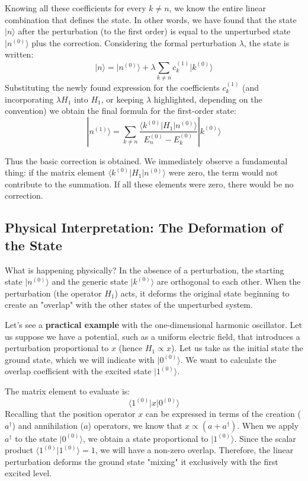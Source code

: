 Knowing all these coefficients for every $k \neq n$, we know the entire linear combination that defines the state.
In other words, we have found that the state $\vert{}n\rangle$ after the perturbation (to the first order) is equal to the unperturbed state $\vert{}n^{(0)}\rangle$ plus the correction. Considering the formal perturbation $\lambda$, the state is written:
\begin{equation}
|n\rangle = |n^{(0)}\rangle + \lambda \sum_{k \neq n} c_k^{(1)} |k^{(0)}\rangle
\end{equation}
Substituting the newly found expression for the coefficients $c_k^{(1)}$ (and incorporating $\lambda H_1$ into $H_1$, or keeping $\lambda$ highlighted, depending on the convention) we obtain the final formula for the first-order state:
\begin{equation}
|n^{(1)}\rangle = \sum_{k \neq n} \frac{\langle k^{(0)} | H_1 | n^{(0)} \rangle}{E_n^{(0)} - E_k^{(0)}} |k^{(0)}\rangle
\end{equation}

Thus the basic correction is obtained. We immediately observe a fundamental thing: if the matrix element $\langle k^{(0)} \vert{} H_1 \vert{} n^{(0)} \rangle$ were zero, the term would not contribute to the summation. If all these elements were zero, there would be no correction.

\subsection{Physical Interpretation: The Deformation of the State}
What is happening physically?
In the absence of a perturbation, the starting state $\vert{}n^{(0)}\rangle$ and the generic state $\vert{}k^{(0)}\rangle$ are orthogonal to each other. When the perturbation (the operator $H_1$) acts, it deforms the original state beginning to create an "overlap" with the other states of the unperturbed system.

Let's see a \textbf{practical example} with the one-dimensional harmonic oscillator.
Let us suppose we have a potential, such as a uniform electric field, that introduces a perturbation proportional to $x$ (hence $H_1 \propto x$).
Let us take as the initial state the ground state, which we will indicate with $\vert{}0^{(0)}\rangle$. We want to calculate the overlap coefficient with the excited state $\vert{}1^{(0)}\rangle$.

The matrix element to evaluate is:
\begin{equation}
\langle 1^{(0)} | x | 0^{(0)} \rangle
\end{equation}
Recalling that the position operator $x$ can be expressed in terms of the creation ($a^\dagger$) and annihilation ($a$) operators, we know that $x \propto (a + a^\dagger)$. When we apply $a^\dagger$ to the state $\vert{}0^{(0)}\rangle$, we obtain a state proportional to $\vert{}1^{(0)}\rangle$. Since the scalar product $\langle 1^{(0)} \vert{} 1^{(0)} \rangle = 1$, we will have a non-zero overlap. Therefore, the linear perturbation deforms the ground state "mixing" it exclusively with the first excited level.


